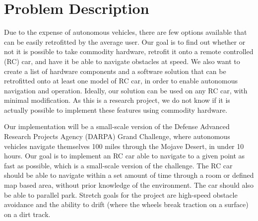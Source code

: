\documentclass[draftclsnofoot,onecolumn,10pt]{IEEEtran}
\begin{document}
\section{Problem Description}
Due to the expense of autonomous vehicles, there are few options available that can be easily retrofitted by the average user. 
Our goal is to find out whether or not it is possible to take commodity hardware, retrofit it onto a remote controlled (RC) car, and have it be able to navigate obstacles at speed. 
We also want to create a list of hardware components and a software solution that can be retrofitted onto at least one model of RC car, in order to enable autonomous navigation and operation. 
Ideally,  our solution can be used on any RC car, with minimal modification. 
As this is a research project, we do not know if it is actually possible to implement these features using commodity hardware.\par
Our implementation will be a small-scale version of the Defense Advanced Research Projects Agency (DARPA) Grand Challenge, where autonomous vehicles navigate themselves 100 miles through the Mojave Desert, in under 10 hours. 
Our goal is to implement an RC car able to navigate to a given point as fast as possible, which is a small-scale version of the challenge. 
The RC car should be able to navigate within a set amount of time through a room or defined map based area, without prior knowledge of the environment.
The car should also be able to parallel park. 
Stretch goals for the project are high-speed obstacle avoidance and the ability to drift (where the wheels break traction on a surface) on a dirt track.
\end{document}
